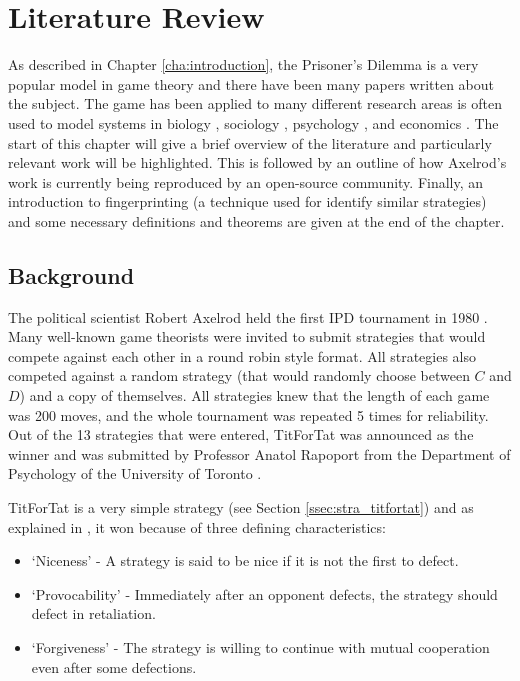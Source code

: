 
\chapter{Literature Review}\label{cha:literature}

As described in Chapter \ref{cha:introduction}, the Prisoner's Dilemma is a very popular model in game theory and there have been many papers written about the subject.
The game has been applied to many different research areas is often used to model systems in biology \cite{Sigmund1999}, sociology \cite{Franken2005}, psychology \cite{Ishibuchi2005}, and economics \cite{Chong2005}.
The start of this chapter will give a brief overview of the literature and particularly relevant work will be highlighted.
This is followed by an outline of how Axelrod's work is currently being reproduced by an open-source community.
Finally, an introduction to fingerprinting (a technique used for identify
similar strategies) and some necessary definitions and theorems are given at the end of the chapter.


\section{Background}\label{sec:axelrodoriginal}

The political scientist Robert Axelrod held the first IPD tournament in 1980 \cite{Axelrod1980a}.
Many well-known game theorists were invited to submit strategies that would compete against each other in a round robin style format.
All strategies also competed against a random strategy (that would randomly choose between $C$ and $D$) and a copy of themselves.
All strategies knew that the length of each game was 200 moves, and the whole tournament was repeated 5 times for reliability.
Out of the 13 strategies that were entered, TitForTat was announced as the winner and was submitted by Professor Anatol Rapoport from the Department of Psychology of the University of Toronto \cite{Rapoport2015}.

TitForTat is a very simple strategy (see Section \ref{ssec:stra_titfortat}) and as explained in \cite{Axelrod1980b}, it won because of three defining characteristics:

\begin{itemize}
    \item `Niceness' - A strategy is said to be nice if it is not the first to defect.
    \item `Provocability' - Immediately after an opponent defects, the strategy should defect in retaliation.
    \item `Forgiveness' - The strategy is willing to continue with mutual cooperation even after some defections.
\end{itemize}

